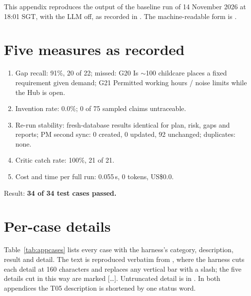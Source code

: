 This appendix reproduces the output of the baseline run of 14 November 2026 at 18:01 SGT, with the LLM off, as recorded in . The machine-readable form is .

\section{Five measures as recorded}
\begin{enumerate}
  \item Gap recall: 91\%, 20 of 22; missed: G20 Is $\sim$100 childcare places a fixed requirement given demand; G21 Permitted working hours / noise limits while the Hub is open.
  \item Invention rate: 0.0\%; 0 of 75 sampled claims untraceable.
  \item Re-run stability: fresh-database results identical for plan, risk, gaps and reports; PM second sync: 0 created, 0 updated, 92 unchanged; duplicates: none.
  \item Critic catch rate: 100\%, 21 of 21.
  \item Cost and time per full run: 0.055\,s, 0 tokens, US\$0.0.
\end{enumerate}
Result: \textbf{34 of 34 test cases passed.}

\section{Per-case details}
Table~\ref{tab:appcases} lists every case with the harness's category, description, result and detail. The text is reproduced verbatim from , where the harness cuts each detail at 160 characters and replaces any vertical bar with a slash; the five details cut in this way are marked [\ldots]. Untruncated detail is in . In both appendices the T05 description is shortened by one status word.

